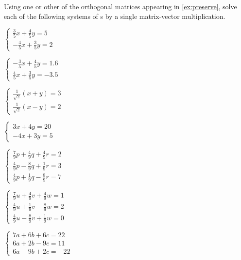 \begin{exercise}  
Using one or other of the orthogonal matrices appearing in \cref{ex:preserve}, solve each of the following systems of s by a single matrix-vector multiplication.
\begin{Parts}
\item \(\begin{cases}
\frac35x+\frac45y=5
\\-\frac45x+\frac35y=2
\end{cases}\)

\begin{OmitV1}
\item \(\begin{cases} 
-\frac35x+\frac45y=1.6
\\\frac45x+\frac35y=-3.5
\end{cases}\)

\item \(\begin{cases}
\frac1{\sqrt2}(x+y)=3
\\\frac1{\sqrt2}(x-y)=2
\end{cases}\)
\end{OmitV1}

\item \(\begin{cases}
3x+4y=20
\\-4x+3y=5
\end{cases}\)

\begin{OmitV1}
\item \(\begin{cases}
\frac79p+\frac49q+\frac49r=2
\\\frac49p-\frac89q+\frac19r=3
\\\frac49p+\frac19q-\frac89r=7
\end{cases}\)

\item \(\begin{cases}
\frac79u+\frac49v+\frac49w=1
\\\frac49u+\frac19v-\frac89w=2
\\\frac49u-\frac89v+\frac19w=0
\end{cases}\)
\end{OmitV1}

\item \(\begin{cases}
7a+6b+6c=22
\\6a+2b-9c=11
\\6a-9b+2c=-22
\end{cases}\)


\end{Parts}
\end{exercise}
